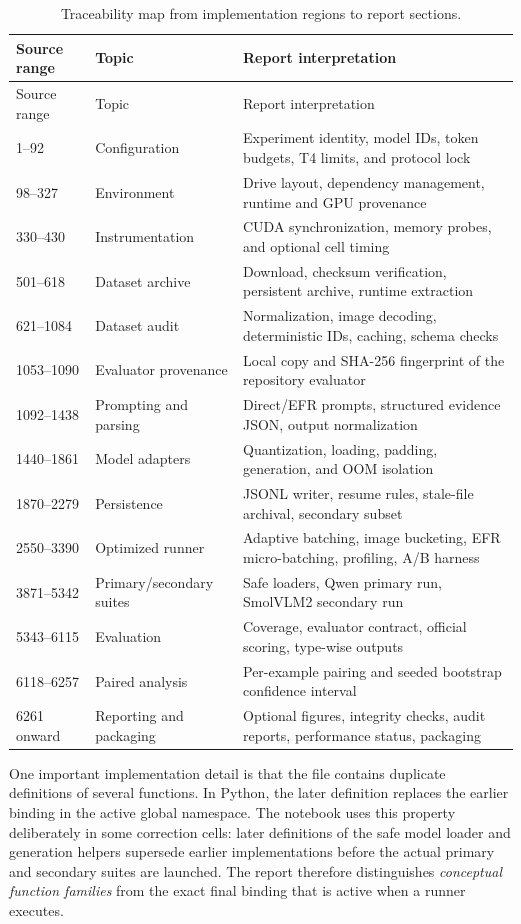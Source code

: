 \documentclass[11pt,a4paper]{article}
\newcommand{\term}[1]{\textit{#1}}
\begin{document}
\footnotesize
\begin{longtable}{p{}p{}p{}}
\caption{Traceability map from implementation regions to report sections.}\label{tab:trace}\\
\toprule
Source range & Topic & Report interpretation \\
\midrule
\endfirsthead
\toprule
Source range & Topic & Report interpretation \\
\midrule
\endhead
1--92 & Configuration & Experiment identity, model IDs, token budgets, T4 limits, and protocol lock \\
98--327 & Environment & Drive layout, dependency management, runtime and GPU provenance \\
330--430 & Instrumentation & CUDA synchronization, memory probes, and optional cell timing \\
501--618 & Dataset archive & Download, checksum verification, persistent archive, runtime extraction \\
621--1084 & Dataset audit & Normalization, image decoding, deterministic IDs, caching, schema checks \\
1053--1090 & Evaluator provenance & Local copy and SHA-256 fingerprint of the repository evaluator \\
1092--1438 & Prompting and parsing & Direct/EFR prompts, structured evidence JSON, output normalization \\
1440--1861 & Model adapters & Quantization, loading, padding, generation, and OOM isolation \\
1870--2279 & Persistence & JSONL writer, resume rules, stale-file archival, secondary subset \\
2550--3390 & Optimized runner & Adaptive batching, image bucketing, EFR micro-batching, profiling, A/B harness \\
3871--5342 & Primary/secondary suites & Safe loaders, Qwen primary run, SmolVLM2 secondary run \\
5343--6115 & Evaluation & Coverage, evaluator contract, official scoring, type-wise outputs \\
6118--6257 & Paired analysis & Per-example pairing and seeded bootstrap confidence interval \\
6261 onward & Reporting and packaging & Optional figures, integrity checks, audit reports, performance status, packaging \\
\bottomrule
\end{longtable}
\normalsize

One important implementation detail is that the file contains duplicate definitions of several functions. In Python, the later definition replaces the earlier binding in the active global namespace. The notebook uses this property deliberately in some correction cells: later definitions of the safe model loader and generation helpers supersede earlier implementations before the actual primary and secondary suites are launched. The report therefore distinguishes \term{conceptual function families} from the exact final binding that is active when a runner executes.
\end{document}

